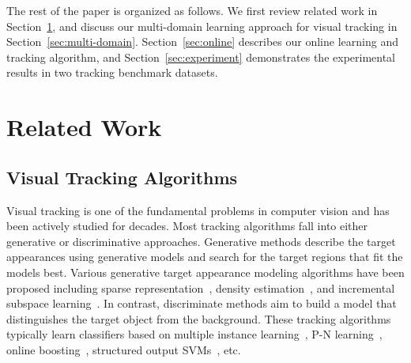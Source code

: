 \documentclass[10pt,twocolumn,letterpaper]{article}
\begin{document}
The rest of the paper is organized as follows.
We first review related work in Section~\ref{sec:related}, and discuss our multi-domain learning approach for visual tracking in Section~\ref{sec:multi-domain}.
Section~\ref{sec:online} describes our online learning and tracking algorithm, and Section~\ref{sec:experiment} demonstrates the experimental results in two tracking benchmark datasets.


\section{Related Work}
\label{sec:related}

\subsection{Visual Tracking Algorithms}
Visual tracking is one of the fundamental problems in computer vision and has been actively studied for decades. 
Most tracking algorithms fall into either generative or discriminative approaches. 
Generative methods describe the target appearances using generative models and search for the target regions that fit the models best. 
Various generative target appearance modeling algorithms have been proposed including sparse representation~\cite{mei2009robust,zhang2012robust}, density estimation~\cite{HanTPAMI08,JepsonTPAMI03}, and incremental subspace learning~\cite{ross2008incremental}. 
In contrast, discriminate methods aim to build a model that distinguishes the target object from the background.  
These tracking algorithms typically learn classifiers based on multiple instance learning~\cite{BabenkoTPAMI11}, P-N learning~\cite{kalal2012tracking}, online boosting~\cite{GrabnerBMVC06,GrabnerECCV08}, structured output SVMs~\cite{hare2011struck}, etc.
\end{document}
